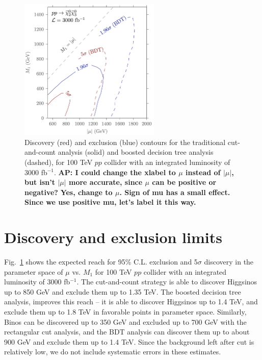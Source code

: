 \documentclass[a4paper,11pt]{article}
\newcommand{\Shufang}[1]{{\bf\color{Maroon}  #1}}
\newcommand{\Adarsh}[1]{{\bf\color{RoyalBlue} AP: #1}}
\begin{document}
\begin{figure}[h]
\centering
\includegraphics[width=0.6\textwidth]{images/dm_100_TeV_contours.png}

\caption{ Discovery (red) and exclusion (blue) contours for the traditional
  cut-and-count analysis (solid) and boosted decision tree analysis (dashed),
  for 100 TeV $pp$ collider with an integrated luminosity of 3000 fb$^{-1}$.
\Adarsh{  I could change the xlabel
to $\mu$ instead of $|\mu|$, but isn't $|\mu|$ more accurate, since $\mu$ can
be positive or negative?} \Shufang{Yes, change to $\mu$.  Sign of mu has a small effect.  Since we use positive mu, let's label it this way.}
}

\label{fig:contours}
\end{figure}

\section{Discovery and exclusion limits}
\label{sec:results}

Fig.~\ref{fig:contours} shows the expected reach  for 95\% C.L. exclusion and
5$\sigma$ discovery in the parameter space of $\mu$ vs.  $M_1$ for 100 TeV $pp$
collider with an integrated luminosity of 3000 fb$^{-1}$. The cut-and-count
strategy is able to discover Higgsinos up to 850 GeV  and exclude them up to
1.35 TeV.  The boosted decision
tree analysis, improves this reach -- it is able to discover Higgsinos up to
1.4 TeV, and exclude them up to 1.8 TeV in favorable points in parameter space.
Similarly, Binos can be discovered up to 350 GeV and excluded up to 700 GeV
with the rectangular cut analysis, and the BDT analysis can discover them up to
about 900 GeV and exclude them up to 1.4 TeV. Since the background left after
cut is relatively low, we do not include systematic errors in these estimates.  
\end{document}
